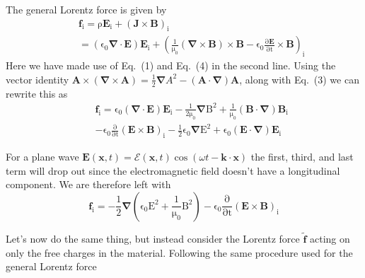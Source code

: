 \documentclass[twocolumn,english,pra,aps,superscriptaddress,floatfix]{revtex4-1}
\begin{document}
The general Lorentz force is given by
\begin{eqnarray}
&&\mathrm{\mathbf{f}_i=\rho \mathbf{E}_i+\left(\mathbf{J} \times \mathbf{B}\right)_i}\nonumber \\
&&=\mathrm{\left(\epsilon_0\mathbf{\nabla} \cdot \mathbf{E}\right)\mathbf{E}_i+\left(\frac{1}{\mu_0}\left(\mathbf{\nabla}\times \mathbf{B}\right)\times\mathbf{B}-\epsilon_0\frac{\partial \mathbf{E}}{\partial t} \times \mathbf{B}\right)_i}
\end{eqnarray}
Here we have made use of Eq.\ (1) and Eq.\ (4) in the second line.  Using the vector identity $\mathbf{A}\times\left(\mathbf{\nabla}\times \mathbf{A}\right)=\frac{1}{2}\mathbf{\nabla}A^2-\left(\mathbf{A}\cdot\mathbf{\nabla}\right)\mathbf{A}$, along with Eq.\ (3) we can rewrite this as
\begin{eqnarray}
&&\mathrm{\mathbf{f}_i=\epsilon_0\left(\mathbf{\nabla} \cdot \mathbf{E}\right)\mathbf{E}_i-\frac{1}{2\mu_0}\mathbf{\nabla}B^2+\frac{1}{\mu_0}\left(\mathbf{B}\cdot\mathbf{\nabla}\right)\mathbf{B}_i} \nonumber \\
&&\mathrm{-\epsilon_0\frac{\partial}{\partial t} \left(\mathbf{E}\times \mathbf{B}\right)_i-\frac{1}{2}\epsilon_0\mathbf{\nabla}E^2+\epsilon_0\left(\mathbf{E}\cdot\mathbf{\nabla}\right)\mathbf{E}_i}
\end{eqnarray}

For a plane wave $\mathbf{E}(\mathbf{x},t)=\mathbf{\mathcal{E}}(\mathbf{x},t)\cos{(\omega t -\mathbf{k\cdot x})}$ the first, third, and last term will drop out since the electromagnetic field doesn't have a longitudinal component.  We are therefore left with
\begin{equation}
\mathrm{\mathbf{f}_i=-\frac{1}{2}\mathbf{\nabla}\left(\epsilon_0 E^2+\frac{1}{\mu_0}B^2\right)-\epsilon_0\frac{\partial}{\partial t} \left(\mathbf{E}\times \mathbf{B}\right)_i}
\end{equation}

Let's now do the same thing, but instead consider the Lorentz force $\tilde{\mathbf{f}}$ acting on only the free charges in the material.  Following the same procedure used for the general Lorentz force
\end{document}
